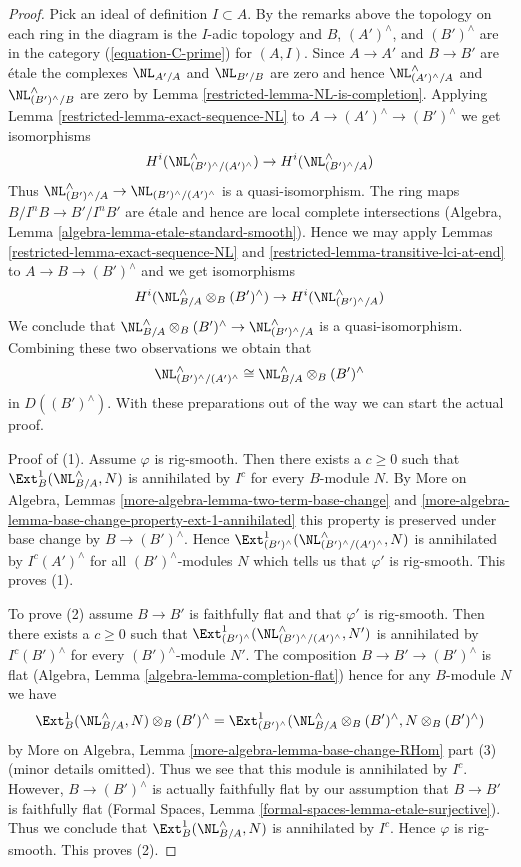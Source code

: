 \begin{proof}
\medskip\noindent
Pick an ideal of definition $I \subset A$. By the remarks above
the topology on each ring in the diagram is the $I$-adic topology
and $B$, $(A')^\wedge$, and $(B')^\wedge$ are in the category
(\ref{equation-C-prime}) for $(A, I)$.
Since $A \to A'$ and $B \to B'$ are \'etale the complexes
$\NL_{A'/A}$ and $\NL_{B'/B}$ are zero and hence
$\NL_{(A')^\wedge/A}^\wedge$ and $\NL_{(B')^\wedge/B}^\wedge$
are zero by Lemma \ref{restricted-lemma-NL-is-completion}.
Applying Lemma \ref{restricted-lemma-exact-sequence-NL} to
$A \to (A')^\wedge \to (B')^\wedge$ we get isomorphisms
$$
H^i(\NL_{(B')^\wedge/(A')^\wedge}^\wedge) \to H^i(\NL_{(B')^\wedge/A}^\wedge)
$$
Thus $\NL_{(B')^\wedge/A}^\wedge \to \NL_{(B')^\wedge/(A')^\wedge}$
is a quasi-isomorphism. The ring maps $B/I^nB \to B'/I^nB'$ are \'etale
and hence are local complete intersections
(Algebra, Lemma \ref{algebra-lemma-etale-standard-smooth}).
Hence we may apply
Lemmas \ref{restricted-lemma-exact-sequence-NL} and
\ref{restricted-lemma-transitive-lci-at-end} to
$A \to B \to (B')^\wedge$ and we get isomorphisms
$$
H^i(\NL_{B/A}^\wedge \otimes_B (B')^\wedge) \to
H^i(\NL_{(B')^\wedge/A}^\wedge)
$$
We conclude that
$\NL_{B/A}^\wedge \otimes_B (B')^\wedge \to \NL_{(B')^\wedge/A}^\wedge$
is a quasi-isomorphism. Combining these two observations we obtain that
$$
\NL_{(B')^\wedge/(A')^\wedge}^\wedge \cong
\NL_{B/A}^\wedge \otimes_B (B')^\wedge
$$
in $D((B')^\wedge)$.
With these preparations out of the way we can start the actual proof.

\medskip\noindent
Proof of (1). Assume $\varphi$ is rig-smooth. Then there exists a $c \geq 0$
such that $\Ext^1_B(\NL_{B/A}^\wedge, N)$ is annihilated by $I^c$
for every $B$-module $N$. By
More on Algebra, Lemmas \ref{more-algebra-lemma-two-term-base-change} and
\ref{more-algebra-lemma-base-change-property-ext-1-annihilated}
this property is preserved under base change by $B \to (B')^\wedge$.
Hence $\Ext^1_{(B')^\wedge}(\NL_{(B')^\wedge/(A')^\wedge}^\wedge, N)$
is annihilated by $I^c(A')^\wedge$ for all $(B')^\wedge$-modules $N$
which tells us that $\varphi'$ is rig-smooth.
This proves (1).

\medskip\noindent
To prove (2) assume $B \to B'$ is faithfully flat and that $\varphi'$
is rig-smooth. Then there exists a $c \geq 0$ such that
$\Ext^1_{(B')^\wedge}(\NL_{(B')^\wedge/(A')^\wedge}^\wedge, N')$
is annihilated by $I^c(B')^\wedge$ for every $(B')^\wedge$-module $N'$.
The composition $B \to B' \to (B')^\wedge$ is flat
(Algebra, Lemma \ref{algebra-lemma-completion-flat})
hence for any $B$-module $N$ we have
$$
\Ext^1_B(\NL_{B/A}^\wedge, N) \otimes_B (B')^\wedge =
\Ext^1_{(B')^\wedge}(\NL_{B/A}^\wedge \otimes_B (B')^\wedge,
N \otimes_B (B')^\wedge)
$$
by More on Algebra, Lemma \ref{more-algebra-lemma-base-change-RHom} part (3)
(minor details omitted). Thus we see that this module is annihilated
by $I^c$. However, $B \to (B')^\wedge$ is actually faithfully flat
by our assumption that $B \to B'$ is faithfully flat (Formal Spaces, Lemma
\ref{formal-spaces-lemma-etale-surjective}). Thus we conclude that
$\Ext^1_B(\NL_{B/A}^\wedge, N)$ is annihilated by $I^c$.
Hence $\varphi$ is rig-smooth. This proves (2).


\end{proof}
